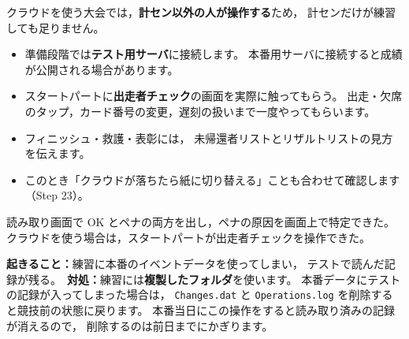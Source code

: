 クラウドを使う大会では，\textbf{計セン以外の人が操作する}ため，
計センだけが練習しても足りません。

\begin{itemize}
\item 準備段階では\textbf{テスト用サーバ}に接続します。
      本番用サーバに接続すると成績が公開される場合があります。
\item スタートパートに\textbf{出走者チェック}の画面を実際に触ってもらう。
      出走・欠席のタップ，カード番号の変更，遅刻の扱いまで一度やってもらいます。
\item フィニッシュ・救護・表彰には，
      未帰還者リストとリザルトリストの見方を伝えます。
\item このとき「クラウドが落ちたら紙に切り替える」ことも合わせて確認します（Step 23）。
\end{itemize}

\begin{Done}
読み取り画面で OK とペナの両方を出し，ペナの原因を画面上で特定できた。
クラウドを使う場合は，スタートパートが出走者チェックを操作できた。
\end{Done}

\begin{Fail}
\textbf{起きること：}練習に本番のイベントデータを使ってしまい，
テストで読んだ記録が残る。\
\textbf{対処：}練習には\textbf{複製したフォルダ}を使います。
本番データにテストの記録が入ってしまった場合は，
\texttt{Changes.dat} と \texttt{Operations.log} を削除すると競技前の状態に戻ります。
本番当日にこの操作をすると読み取り済みの記録が消えるので，
削除するのは前日までにかぎります。
\end{Fail}
